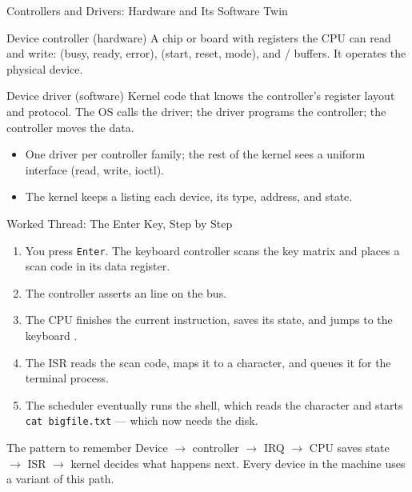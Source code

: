 \documentclass[aspectratio=169]{beamer}
\begin{document}
\begin{frame}{Controllers and Drivers: Hardware and Its Software Twin}
  \begin{block}{Device controller (hardware)}
    A chip or board with registers the CPU can read and write: 
    (busy, ready, error),  (start, reset, mode), and
    / buffers. It operates the physical device.
  \end{block}
  \begin{block}{Device driver (software)}
    Kernel code that knows the controller's register layout and protocol. The
    OS calls the driver; the driver programs the controller; the controller
    moves the data.
  \end{block}
  \vspace{0.15cm}
  \begin{itemize}
    \item One driver per controller family; the rest of the kernel sees a
      uniform interface (read, write, ioctl).
    \item The kernel keeps a  listing each device, its
      type, address, and state.
  \end{itemize}
  \vspace{0.1cm}
\end{frame}

\begin{frame}{Worked Thread: The Enter Key, Step by Step}
  \begin{enumerate}
    \item You press \texttt{Enter}. The keyboard controller scans the key matrix
      and places a scan code in its data register.
    \item The controller asserts an  line on the bus.
    \item The CPU finishes the current instruction, saves its state, and jumps
      to the keyboard .
    \item The ISR reads the scan code, maps it to a character, and queues it for
      the terminal process.
    \item The scheduler eventually runs the shell, which reads the character and
      starts \texttt{cat bigfile.txt} --- which now needs the disk.
  \end{enumerate}
  \vspace{0.15cm}
  \begin{alertblock}{The pattern to remember}
    Device $\to$ controller $\to$ IRQ $\to$ CPU saves state $\to$ ISR $\to$
    kernel decides what happens next. Every device in the machine uses a variant
    of this path.
  \end{alertblock}
\end{frame}
\end{document}
